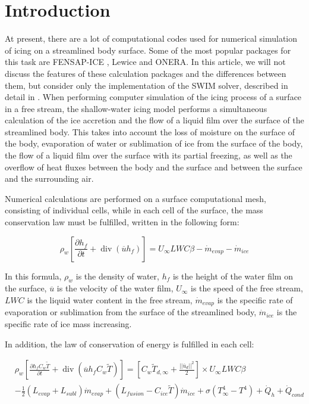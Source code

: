 \documentclass[
11pt,%
tightenlines,%
twoside,%
onecolumn,%
nofloats,%
nobibnotes,%
nofootinbib,%
superscriptaddress,%
noshowpacs,%
centertags]%
{revtex4}
\begin{document}
\section{Introduction}

At present, there are a lot of computational codes used for numerical simulation of icing on a streamlined body surface.
Some of the most popular packages for this task are FENSAP-ICE \cite{Bourgault}, Lewice \cite{Wright} and ONERA.
In this article, we will not discuss the features of these calculation packages and the differences between them, but consider only the implementation of the SWIM solver, described in detail in \cite{Bourgault}.
When performing computer simulation of the icing process of a surface in a free stream, the shallow-water icing model performs a simultaneous calculation of the ice accretion and the flow of a liquid film over the surface of the streamlined body. This takes into account the loss of moisture on the surface of the body, evaporation of water or sublimation of ice from the surface of the body, the flow of a liquid film over the surface with its partial freezing, as well as the overflow of heat fluxes between the body and the surface and between the surface and the surrounding air.

Numerical calculations are performed on a surface computational mesh, consisting of individual cells, while in each cell of the surface, the mass conservation law must be fulfilled, written in the following form:

\begin{equation}
\rho_w \left[ \frac{\partial h_f}{\partial t} + \operatorname{div}(\overline{u} h_f) \right] = U_{\infty} LWC \beta - \dot m_{evap} - \dot m_{ice}
\end{equation}

In this formula, $\rho_w$ is the density of water, $h_f$ is the height of the water film on the surface, $\overline{u}$ is the velocity of the water film, $U_{\infty}$ is the speed of the free stream, $LWC$ is the liquid water content in the free stream, $\dot m_{evap}$ is the specific rate of evaporation or sublimation from the surface of the streamlined body, $\dot m_{ice}$ is the specific rate of ice mass increasing.

In addition, the law of conservation of energy is fulfilled in each cell:

\begin{equation}
\begin{aligned}
& \rho_w \left[ \frac{\partial h_f C_w \tilde{T}}{\partial t} + \operatorname{div}(\overline{u} h_f C_w \tilde{T}) \right] = \left[ C_w \tilde{T}_{d,\infty} + \frac{||\overline{u}_d||^2}{2} \right] \times U_{\infty} LWC \beta
\\
& - \frac{1}{2}(L_{evap} + L_{subl}) \dot m_{evap} + (L_{fusion} - C_{ice} \tilde{T}) \dot m_{ice} + \sigma (T_{\infty}^4 - T^4) + \dot Q_h + \dot Q_{cond}
\end{aligned}
\end{equation}
\end{document}
